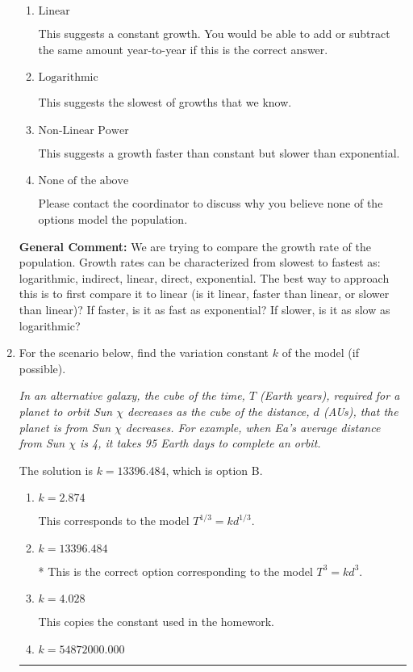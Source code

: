 \documentclass{extbook}[14pt]
\newcommand{\litem}[1]{\item #1

\rule{\textwidth}{0.4pt}}
\begin{document}
\begin{enumerate}
{\begin{enumerate}[label=\Alph*.]
This suggests the fastest of growths that we know.
\item \( \text{Linear} \)

This suggests a constant growth. You would be able to add or subtract the same amount year-to-year if this is the correct answer.
\item \( \text{Logarithmic} \)

This suggests the slowest of growths that we know.
\item \( \text{Non-Linear Power} \)

This suggests a growth faster than constant but slower than exponential.
\item \( \text{None of the above} \)

Please contact the coordinator to discuss why you believe none of the options model the population.
\end{enumerate}

\textbf{General Comment:} We are trying to compare the growth rate of the population. Growth rates can be characterized from slowest to fastest as: logarithmic, indirect, linear, direct, exponential. The best way to approach this is to first compare it to linear (is it linear, faster than linear, or slower than linear)? If faster, is it as fast as exponential? If slower, is it as slow as logarithmic?
}
\litem{
For the scenario below, find the variation constant $k$ of the model (if possible).

\begin{center}
    \textit{ In an alternative galaxy, the cube of the time, $T$ (Earth years), required for a planet to orbit Sun $\chi$ decreases as the cube of the distance, $d$ (AUs), that the planet is from Sun $\chi$ decreases. For example, when Ea's average distance from Sun $\chi$ is 4, it takes 95 Earth days to complete an orbit. }
\end{center}
The solution is \( k = 13396.484 \), which is option B.\begin{enumerate}[label=\Alph*.]
\item \( k = 2.874 \)

This corresponds to the model $T^{1/3} = k d^{1/3}$.
\item \( k = 13396.484 \)

* This is the correct option corresponding to the model $T^{3} = k d^{3}$.
\item \( k = 4.028 \)

This copies the constant used in the homework.
\item \( k = 54872000.000 \)


\end{enumerate}}
\end{enumerate}
\end{document}
